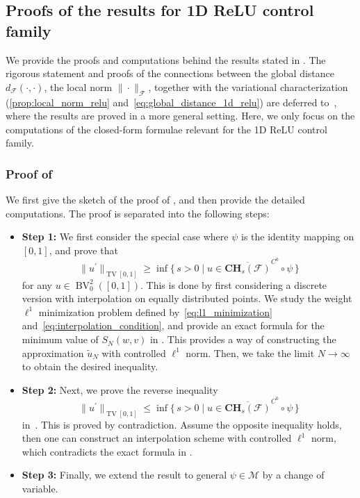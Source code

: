 \documentclass[12pt]{amsart}
\numberwithin{equation}{section}
\theoremstyle{remark}
\begin{document}
\subsection{Proofs of the results for 1D ReLU control family}
\label{sec:1d_relu_proofs}

We provide the proofs and computations
behind the results stated in .
The rigorous statement and proofs of the connections between the global distance $d_{\mathcal F}(\cdot, \cdot)$, the local norm $\|\cdot\|_{\mathcal F}$, together
with the variational characterization (\eqref{prop:local_norm_relu} and~\eqref{eq:global_distance_1d_relu}) are deferred to~,
where the results are proved in a more general setting.
Here, we only focus on the computations of the closed-form formulae
relevant for the 1D ReLU control family.
\subsubsection{Proof of }
We first give the sketch of the proof of , and
then provide the detailed computations. The proof is separated into the following steps:
\begin{itemize}
    \item \textbf{Step 1: } We first consider the special case where $\psi$ is the identity mapping on $[0,1]$, and prove that
    \begin{equation}
        \|u^\prime\|_{\operatorname{TV}[0,1]} \ge \inf\{\,s>0\mid u\in \overline{\mathbf{CH}_s(\mathcal F)}^{C^0}\circ \psi\,\}
    \end{equation}
    for any $u\in \operatorname{BV}^2_0([0,1])$.
    This is done by first considering a discrete version with interpolation on equally distributed points. We study the weight $\ell^1$ minimization problem defined by~\eqref{eq:l1_minimization} and~\eqref{eq:interpolation_condition}, and provide an exact formula for the minimum value of $S_N(w,v)$ in . This provides a way of constructing the approximation $\tilde u_N$ with controlled $\ell^1$ norm. Then, we take the limit $N\to \infty$ to obtain the desired inequality.
    \item \textbf{Step 2: } Next, we prove the reverse inequality
    \begin{equation}
        \|u^\prime\|_{\operatorname{TV}[0,1]} \le \inf\{\,s>0\mid u\in \overline{\mathbf{CH}_s(\mathcal F)}^{C^0}\circ \psi\,\}
    \end{equation}
    in~.
    This is proved by contradiction. Assume the opposite inequality holds, then one can construct an interpolation scheme with controlled $\ell^1$ norm, which contradicts the exact formula in .
    \item \textbf{Step 3: } Finally, we extend the result to general $\psi\in \mathcal M$ by a change of variable.
\end{itemize}
\end{document}
